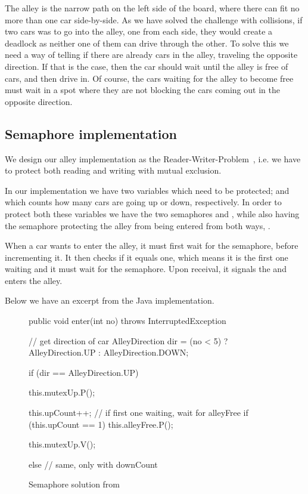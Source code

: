 
The alley is the narrow path on the left side of the board, where
there can fit no more than one car side-by-side. As we have solved the
challenge with collisions, if two cars was to go into the alley, one
from each side, they would create a deadlock as neither one of them
can drive through the other. To solve this we need a way of telling if
there are already cars in the alley, traveling the opposite
direction. If that is the case, then the car should wait until the
alley is free of cars, and then drive in. Of course, the cars waiting
for the alley to become free must wait in a spot where they are not
blocking the cars coming out in the opposite direction.


\subsection{Semaphore implementation}
\label{sub:all-sema}
We design our alley implementation as the
Reader-Writer-Problem~\cite[p. 170]{andrews}, i.e. we have to protect
both reading and writing with mutual exclusion.

In our implementation we have two variables which need to be
protected;  and  which counts how many
cars are going up or down, respectively. In order to protect both
these variables we have the two semaphores  and
, while also having the semaphore protecting the alley
from being entered from both ways, .

When a car wants to enter the alley, it must first wait for the
 semaphore, before incrementing it. It then checks if it
equals one, which means it is the first one waiting and it must wait
for the  semaphore. Upon receival, it signals the
 and enters the alley.

Below we have an excerpt from the Java implementation.

\begin{figure}[H]
\label{lst:all-sem}
  \begin{java}
public void enter(int no) throws InterruptedException {
  // get direction of car
  AlleyDirection dir = (no < 5) ? AlleyDirection.UP : AlleyDirection.DOWN;

  if (dir == AlleyDirection.UP) {
    this.mutexUp.P();

    this.upCount++;
    // if first one waiting, wait for alleyFree
    if (this.upCount == 1)
      this.alleyFree.P();

    this.mutexUp.V();

  } else {
    // same, only with downCount
  }
}
  \end{java}
  \caption{Semaphore solution from }
\end{figure}

